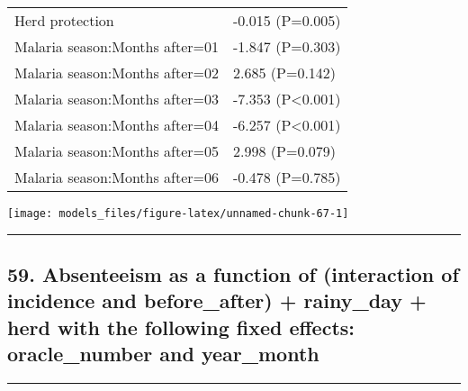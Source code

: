 \documentclass[]{article}
\begin{document}
\begin{longtable}[t]{ll}
\hspace{1em}Herd protection & -0.015 (P=0.005)\\
\hspace{1em}Malaria season:Months after=01 & -1.847 (P=0.303)\\
\hspace{1em}Malaria season:Months after=02 & 2.685 (P=0.142)\\
\hspace{1em}Malaria season:Months after=03 & -7.353 (P<0.001)\\
\hspace{1em}Malaria season:Months after=04 & -6.257 (P<0.001)\\
\hspace{1em}Malaria season:Months after=05 & 2.998 (P=0.079)\\
\hspace{1em}Malaria season:Months after=06 & -0.478 (P=0.785)\\*
\end{longtable}

\begin{center}\texttt{[image: models\_files/figure-latex/unnamed-chunk-67-1]} \end{center}

\newpage

\begin{center}\rule{0.5\linewidth}{\linethickness}\end{center}

\subsection{59. Absenteeism as a function of (interaction of incidence
and before\_after) + rainy\_day + herd with the following fixed effects:
oracle\_number and
year\_month}\label{absenteeism-as-a-function-of-interaction-of-incidence-and-before_after-rainy_day-herd-with-the-following-fixed-effects-oracle_number-and-year_month}

\begin{center}\rule{0.5\linewidth}{\linethickness}\end{center}
\end{document}
